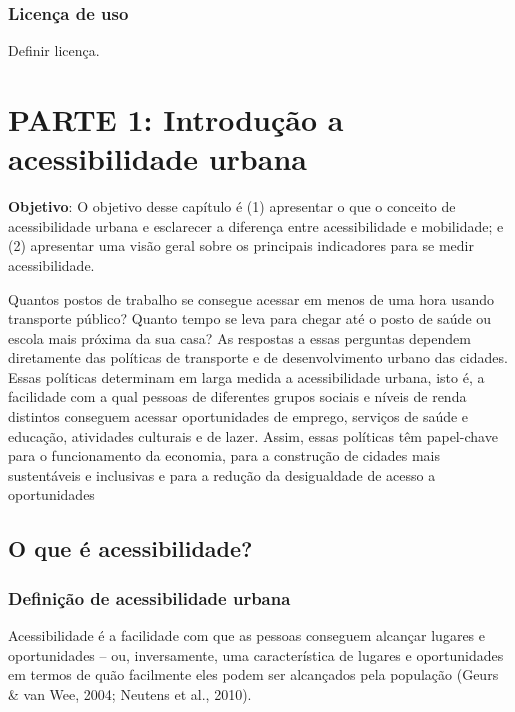 \documentclass[
  letterpaper,
  DIV=11,
  numbers=noendperiod]{scrreprt}
\begin{document}
\hypertarget{licenuxe7a-de-uso}{%
\section*{Licença de uso}\label{licenuxe7a-de-uso}}

Definir licença.

\part{PARTE 1: Introdução a acessibilidade urbana}

\textbf{Objetivo}: O objetivo desse capítulo é (1) apresentar o que o
conceito de acessibilidade urbana e esclarecer a diferença entre
acessibilidade e mobilidade; e (2) apresentar uma visão geral sobre os
principais indicadores para se medir acessibilidade.

Quantos postos de trabalho se consegue acessar em menos de uma hora
usando transporte público? Quanto tempo se leva para chegar até o posto
de saúde ou escola mais próxima da sua casa? As respostas a essas
perguntas dependem diretamente das políticas de transporte e de
desenvolvimento urbano das cidades. Essas políticas determinam em larga
medida a acessibilidade urbana, isto é, a facilidade com a qual pessoas
de diferentes grupos sociais e níveis de renda distintos conseguem
acessar oportunidades de emprego, serviços de saúde e educação,
atividades culturais e de lazer. Assim, essas políticas têm papel-chave
para o funcionamento da economia, para a construção de cidades mais
sustentáveis e inclusivas e para a redução da desigualdade de acesso a
oportunidades

\hypertarget{o-que-uxe9-acessibilidade}{%
\chapter{O que é acessibilidade?}\label{o-que-uxe9-acessibilidade}}

\hypertarget{definiuxe7uxe3o-de-acessibilidade-urbana}{%
\section{Definição de acessibilidade
urbana}\label{definiuxe7uxe3o-de-acessibilidade-urbana}}

Acessibilidade é a facilidade com que as pessoas conseguem alcançar
lugares e oportunidades -- ou, inversamente, uma característica de
lugares e oportunidades em termos de quão facilmente eles podem ser
alcançados pela população (Geurs \& van Wee, 2004; Neutens et al.,
2010).
\end{document}
